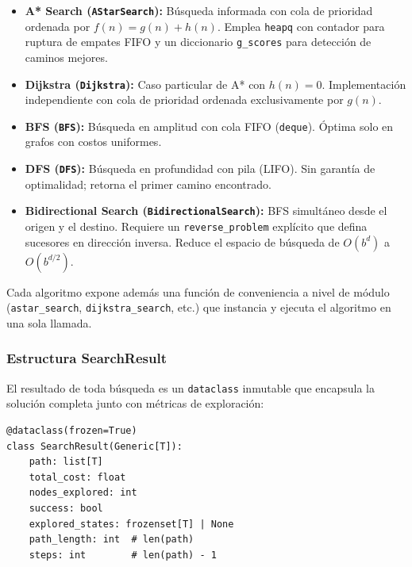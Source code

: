 \begin{itemize}
    \item \textbf{A* Search (\texttt{AStarSearch}):} Búsqueda informada con cola de prioridad ordenada por $f(n) = g(n) + h(n)$. Emplea \texttt{heapq} con contador para ruptura de empates FIFO y un diccionario \texttt{g\_scores} para detección de caminos mejores.

    \item \textbf{Dijkstra (\texttt{Dijkstra}):} Caso particular de A* con $h(n) = 0$. Implementación independiente con cola de prioridad ordenada exclusivamente por $g(n)$.

    \item \textbf{BFS (\texttt{BFS}):} Búsqueda en amplitud con cola FIFO (\texttt{deque}). Óptima solo en grafos con costos uniformes.

    \item \textbf{DFS (\texttt{DFS}):} Búsqueda en profundidad con pila (LIFO). Sin garantía de optimalidad; retorna el primer camino encontrado.

    \item \textbf{Bidirectional Search (\texttt{BidirectionalSearch}):} BFS simultáneo desde el origen y el destino. Requiere un \texttt{reverse\_problem} explícito que defina sucesores en dirección inversa. Reduce el espacio de búsqueda de $O(b^d)$ a $O(b^{d/2})$.
\end{itemize}

Cada algoritmo expone además una función de conveniencia a nivel de módulo (\texttt{astar\_search}, \texttt{dijkstra\_search}, etc.) que instancia y ejecuta el algoritmo en una sola llamada.

\subsubsection{Estructura SearchResult}

El resultado de toda búsqueda es un \texttt{dataclass} inmutable que encapsula la solución completa junto con métricas de exploración:

\begin{lstlisting}[caption={Contenedor de resultados inmutable}, label={lst:searchresult}]
@dataclass(frozen=True)
class SearchResult(Generic[T]):
    path: list[T]
    total_cost: float
    nodes_explored: int
    success: bool
    explored_states: frozenset[T] | None
    path_length: int  # len(path)
    steps: int        # len(path) - 1
\end{lstlisting}

